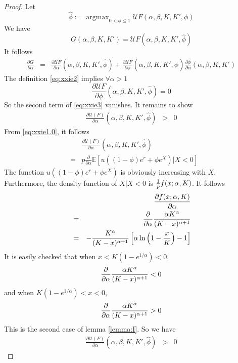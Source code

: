 \documentclass{article}
\newcommand{\pd}[2]{
  \frac{\partial #1}{\partial #2}
}
\newcommand{\opd}[1]{
  \frac{\partial}{\partial #1}
}
\newcommand{\E}{
  \mathbb{E}
}
\newcommand{\1}[1]{
  \mathbf{1}_{\{#1\}}
}
\DeclareMathOperator*{\argmax}{argmax}
\begin{document}
\begin{proof}
  Let
  \begin{equation}
    \label{eq:xxie2}
    \hat \phi := \argmax_{0 < \phi \leq 1}
    \mathcal U F(\alpha, \beta, K, K', \phi)
  \end{equation}
  We have
  \[
  G(\alpha, \beta, K, K') = \mathcal U F(\alpha, \beta, K, K', \hat \phi)
  \]
  It follows
  \begin{eqnarray}
    \pd{G}{\alpha}
    &=&
    \pd{\mathcal U F}{\alpha}(\alpha, \beta, K, K', \hat \phi)
    + \pd{\mathcal U F}{\phi}(\alpha, \beta, K, K', \hat \phi)
    \pd{\hat \phi}{\alpha}(\alpha, \beta, K, K')
    \label{eq:xxie3}
  \end{eqnarray}
  The definition \eqref{eq:xxie2} implies $\forall \alpha > 1$
  \begin{equation}
    \label{eq:xxie4}
    \pd{\mathcal U F}{\phi}(\alpha, \beta, K, K', \hat \phi) = 0
  \end{equation}
  So the second term of \eqref{eq:xxie3} vanishes. It remains to show
  \begin{eqnarray*}
    \pd{\mathcal U(F)}{\alpha}(\alpha, \beta, K, K', \hat \phi)
    &>& 0
  \end{eqnarray*}
  From \eqref{eq:xxie1.0}, it follows
  \begin{eqnarray*}
    && \pd{\mathcal U(F)}{\alpha}(\alpha, \beta, K, K', \hat\phi)
    \\
    &=& p \opd{\alpha}\E[u((1 - \phi) e^r + \phi e^X) | X < 0]
  \end{eqnarray*}
  The function $u((1 - \phi) e^r + \phi e^X)$ is obviously increasing
  with $X$. Furthermore, the density function of $X | X < 0$ is ${1
    \over p} f(x; \alpha, K)$. It follows
  \begin{eqnarray*}
    && \pd{f(x; \alpha, K)}{\alpha} \\
    &=& \opd{\alpha} {\alpha K^\alpha \over (K - x)^{\alpha + 1}} \\
    &=&
    - {K^\alpha \over (K - x)^{\alpha + 1}}
    \left[
      \alpha
      \ln\left(
        1 - {x \over K}
      \right) - 1
    \right]
  \end{eqnarray*}
  It is easily checked that when $x < K(1 - e^{1/\alpha}) < 0$,
  \[
  \opd{\alpha} {\alpha K^\alpha \over (K - x)^{\alpha + 1}} < 0
  \]
  and when $K(1 - e^{1/\alpha}) < x < 0$,
  \[
  \opd{\alpha} {\alpha K^\alpha \over (K - x)^{\alpha + 1}} > 0
  \]
  This is the second case of lemma \ref{lemma:I}. So we have
  \begin{eqnarray*}
    \pd{\mathcal U(F)}{\alpha}(\alpha, \beta, K, K', \hat \phi) &>& 0

\end{eqnarray*}
\end{proof}
\end{document}

